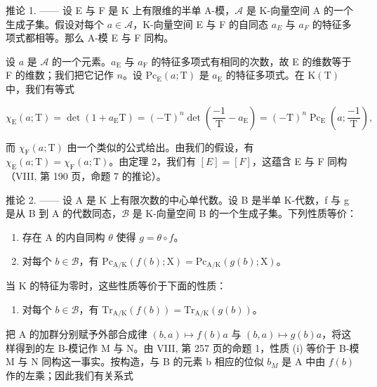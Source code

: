 推论 1. —— 设 E 与 F 是 K 上有限维的半单 A-模，\(\mathcal{A}\) 是 K-向量空间 A 的一个生成子集。假设对每个 \(a \in \mathcal{A}\)，K-向量空间 E 与 F 的自同态 \(a_{E}\) 与 \(a_{F}\) 的特征多项式都相等。那么 A-模 E 与 F 同构。

设 \(a\) 是 \(\mathcal{A}\) 的一个元素。\(a_{\mathrm{E}}\) 与 \(a_{\mathrm{F}}\) 的特征多项式有相同的次数，故 E 的维数等于 F 的维数；我们把它记作 \(n\)。设 \(\mathrm{Pc}_{\mathrm{E}}(a;\mathrm{T})\) 是 \(a_{\mathrm{E}}\) 的特征多项式。在 \(\mathrm{K(T)}\) 中，我们有等式

\[
\chi_ {\mathrm{E}} (a; \mathrm{T}) = \det \left(1 + a _ {\mathrm{E}} \mathrm{T}\right) = (- \mathrm{T}) ^ {n} \det \left(\frac {- 1}{\mathrm{T}} - a _ {\mathrm{E}}\right) = (- \mathrm{T}) ^ {n} \operatorname{Pc} _ {\mathrm{E}} \left(a; \frac {- 1}{\mathrm{T}}\right),
\]

而 \(\chi_{\mathrm{F}}(a;\mathrm{T})\) 由一个类似的公式给出。由我们的假设，有 \(\chi_{\mathrm{E}}(a;\mathrm{T})=\chi_{\mathrm{F}}(a;\mathrm{T})\)。由定理 2，我们有 \([E]=[F]\)，这蕴含 E 与 F 同构（VIII, 第 190 页，命题 7 的推论）。

推论 2. —— 设 A 是 K 上有限次数的中心单代数。设 B 是半单 K-代数，f 与 g 是从 B 到 A 的代数同态，\(\mathcal{B}\) 是 K-向量空间 B 的一个生成子集。下列性质等价：

\begin{enumerate}
\def\labelenumi{(\roman{enumi})}
\item
  存在 A 的内自同构 \(\theta\) 使得 \(g = \theta \circ f\)。
\item
  对每个 \(b \in \mathcal{B}\)，有 \(\mathrm{Pc}_{\mathrm{A / K}}(f(b); \mathrm{X}) = \mathrm{Pc}_{\mathrm{A / K}}(g(b); \mathrm{X})\)。
\end{enumerate}

当 \(\mathrm{K}\) 的特征为零时，这些性质等价于下面的性质：

\begin{enumerate}
\def\labelenumi{(\roman{enumi})}
\setcounter{enumi}{2}
\tightlist
\item
  对每个 \(b \in \mathcal{B}\)，有 \(\mathrm{Tr}_{\mathrm{A / K}}(f(b)) = \mathrm{Tr}_{\mathrm{A / K}}(g(b))\)。
\end{enumerate}

把 A 的加群分别赋予外部合成律 \((b,a)\mapsto f(b)a\) 与 \((b,a)\mapsto g(b)a\)，将这样得到的左 B-模记作 M 与 N。由 VIII, 第 257 页的命题 1，性质 (i) 等价于 B-模 M 与 N 同构这一事实。按构造，与 B 的元素 b 相应的位似 \(b_{M}\) 是 A 中由 \(f(b)\) 作的左乘；因此我们有关系式

